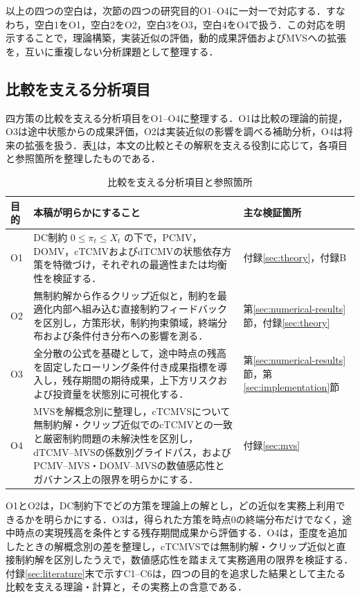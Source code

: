 \documentclass[10pt,a4paper]{article}
\theoremstyle{plain}
\theoremstyle{definition}
\begin{document}
以上の四つの空白は，次節の四つの研究目的O1--O4に一対一で対応する．すなわち，空白1をO1，空白2をO2，空白3をO3，空白4をO4で扱う．この対応を明示することで，理論構築，実装近似の評価，動的成果評価およびMVSへの拡張を，互いに重複しない分析課題として整理する．

\subsection{比較を支える分析項目}

四方策の比較を支える分析項目をO1--O4に整理する．O1は比較の理論的前提，O3は途中状態からの成果評価，O2は実装近似の影響を調べる補助分析，O4は将来の拡張を扱う．表\ref{tab:objectives}は，本文の比較とその解釈を支える役割に応じて，各項目と参照箇所を整理したものである．

\begin{table}[htbp]
\centering\small
\caption{比較を支える分析項目と参照箇所}
\label{tab:objectives}
\begin{tabularx}{\textwidth}{p{12mm}p{100mm}X}
\toprule
目的 & 本稿が明らかにすること & 主な検証箇所 \\
\midrule
O1
& DC制約 $0\leq\pi_t\leq X_t$ の下で，PCMV，DOMV，cTCMVおよびdTCMVの状態依存方策を特徴づけ，それぞれの最適性または均衡性を検証する．
& 付録\ref{sec:theory}，付録B \\
O2
& 無制約解から作るクリップ近似と，制約を最適化内部へ組み込む直接制約フィードバックを区別し，方策形状，制約拘束領域，終端分布および条件付き分布への影響を測る．
& 第\ref{sec:numerical-results}節，付録\ref{sec:theory} \\
O3
& 全分散の公式を基礎として，途中時点の残高を固定したローリング条件付き成果指標を導入し，残存期間の期待成果，上下方リスクおよび投資量を状態別に可視化する．
& 第\ref{sec:numerical-results}節，第\ref{sec:implementation}節 \\
O4
& MVSを解概念別に整理し，cTCMVSについて無制約解・クリップ近似でのcTCMVとの一致と厳密制約問題の未解決性を区別し，dTCMV--MVSの係数別グライドパス，およびPCMV--MVS・DOMV--MVSの数値感応性とガバナンス上の限界を明らかにする．
& 付録\ref{sec:mvs} \\
\bottomrule
\end{tabularx}
\end{table}

O1とO2は，DC制約下でどの方策を理論上の解とし，どの近似を実務上利用できるかを明らかにする．O3は，得られた方策を時点0の終端分布だけでなく，途中時点の実現残高を条件とする残存期間成果から評価する．O4は，歪度を追加したときの解概念別の差を整理し，cTCMVSでは無制約解・クリップ近似と直接制約解を区別したうえで，数値感応性を踏まえて実務適用の限界を検証する．付録\ref{sec:literature}末で示すC1--C6は，四つの目的を追求した結果として主たる比較を支える理論・計算と，その実務上の含意である．
\end{document}
